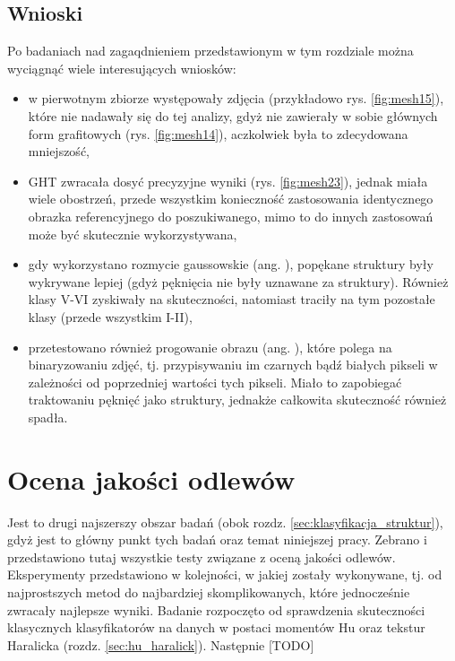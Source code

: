 \subsection{Wnioski}
\label{klasyfikacja.struktur.wnioski}

Po badaniach nad zagaqdnieniem przedstawionym w tym rozdziale można wyciągnąć wiele interesujących wniosków:
\begin{itemize}
	\item w pierwotnym zbiorze występowały zdjęcia (przykładowo rys. \ref{fig:mesh15}), które nie nadawały się do tej analizy, gdyż nie zawierały w sobie głównych form grafitowych (rys. \ref{fig:mesh14}), aczkolwiek była to zdecydowana mniejszość,
	\item GHT zwracała dosyć precyzyjne wyniki (rys. \ref{fig:mesh23}), jednak miała wiele obostrzeń, przede wszystkim konieczność zastosowania identycznego obrazka referencyjnego do poszukiwanego, mimo to do innych zastosowań może być skutecznie wykorzystywana,
	\item gdy wykorzystano rozmycie gaussowskie (ang. ), popękane struktury były wykrywane lepiej (gdyż pęknięcia nie były uznawane za struktury). Również klasy V-VI zyskiwały na skuteczności, natomiast traciły na tym pozostałe klasy (przede wszystkim I-II),
	\item przetestowano również progowanie obrazu (ang. ), które polega na binaryzowaniu zdjęć, tj. przypisywaniu im czarnych bądź białych pikseli w zależności od poprzedniej wartości tych pikseli. Miało to zapobiegać traktowaniu pęknięć jako struktury, jednakże całkowita skuteczność również spadła.
\end{itemize}

\section{Ocena jakości odlewów}
\label{Ocena jakości odlewów}

Jest to drugi najszerszy obszar badań (obok rozdz. \ref{sec:klasyfikacja_struktur}), gdyż jest to główny punkt tych badań oraz temat niniejszej pracy. Zebrano i przedstawiono tutaj wszystkie testy związane z oceną jakości odlewów. Eksperymenty przedstawiono w kolejności, w jakiej zostały wykonywane, tj. od najprostszych metod do najbardziej skomplikowanych, które jednocześnie zwracały najlepsze wyniki. Badanie rozpoczęto od sprawdzenia skuteczności klasycznych klasyfikatorów na danych w postaci momentów Hu oraz tekstur Haralicka (rozdz. \ref{sec:hu_haralick}). Następnie [TODO]


